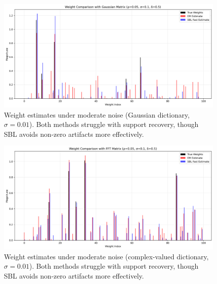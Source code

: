\documentclass{article}
\begin{document}
\begin{figure}[H]
    \centering
    \includegraphics[width=0.75\linewidth]{Figures/weight_comparison_Gaussian_simga0.1.png}
    \caption{Weight estimates under moderate noise (Gaussian dictionary, $\sigma=0.01$). Both methods struggle with support recovery, though SBL avoids non-zero artifacts more effectively.}
    \label{fig:weight001Gauss}
\end{figure}
\begin{figure}[H]
    \centering
    \includegraphics[width=0.75\linewidth]{Figures/weight_comparison_FFT_simga0.1.png}
    \caption{Weight estimates under moderate noise (complex-valued dictionary, $\sigma=0.01$). Both methods struggle with support recovery, though SBL avoids non-zero artifacts more effectively.}
    \label{fig:weight001FFT}
\end{figure}


    
\end{document}
